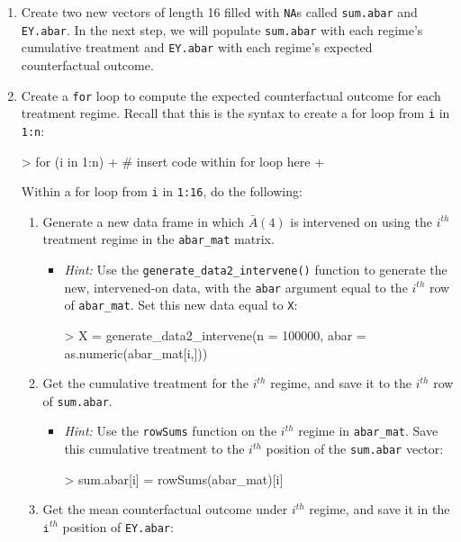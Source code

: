 \documentclass[answers]{exam}
\begin{document}
\begin{enumerate}
\begin{enumerate}
\begin{itemize}
\end{itemize}
\item Create two new vectors of length 16 filled with \texttt{NA}s called \texttt{sum.abar} and \texttt{EY.abar}. In the next step, we will populate \texttt{sum.abar} with each regime's cumulative treatment and \texttt{EY.abar} with each regime's expected counterfactual outcome.
\item Create a \texttt{for} loop to compute the expected counterfactual outcome for each treatment regime. Recall that this is the syntax to create a for loop from \texttt{i} in \texttt{1:n}:
\begin{Schunk}
\begin{Sinput}
> for (i in 1:n) {
+   # insert code within for loop here
+ }
\end{Sinput}
\end{Schunk}
Within a for loop from \texttt{i} in \texttt{1:16}, do the following:
\begin{enumerate}
\item Generate a new data frame in which $\bar{A}(4)$ is intervened on using the $i^{th}$ treatment regime in the \texttt{abar\_mat} matrix.
\begin{itemize}
\item[] \textit{Hint:} Use the \texttt{generate\_data2\_intervene()} function to generate the new, intervened-on data, with the \texttt{abar} argument equal to the $i^{th}$ row of \texttt{abar\_mat}. Set this new data equal to \texttt{X}:
\begin{Schunk}
\begin{Sinput}
> X = generate_data2_intervene(n = 100000, abar = as.numeric(abar_mat[i,]))
\end{Sinput}
\end{Schunk}
\end{itemize}
\item Get the cumulative treatment for the $i^{th}$ regime, and save it to the $i^{th}$ row of \texttt{sum.abar}.
\begin{itemize}
\item[] \textit{Hint:} Use the \texttt{rowSums} function on the $i^{th}$ regime in \texttt{abar\_mat}. Save this cumulative treatment to the $i^{th}$ position of the \texttt{sum.abar} vector:
\begin{Schunk}
\begin{Sinput}
> sum.abar[i] = rowSums(abar_mat)[i]
\end{Sinput}
\end{Schunk}
\end{itemize}
\item Get the mean counterfactual outcome under $i^{th}$ regime, and save it in the $\texttt{i}^{th}$ position of \texttt{EY.abar}:
\begin{Schunk}
\end{Schunk}
\end{enumerate}
\end{enumerate}


\end{enumerate}
\end{document}
